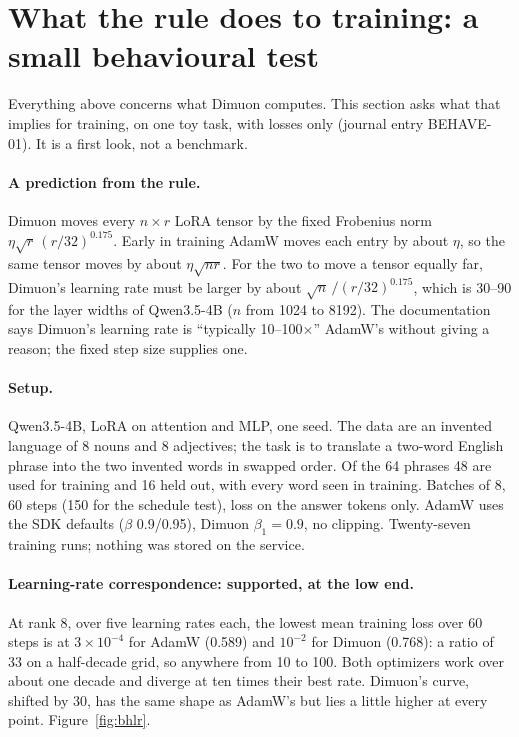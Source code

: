 \documentclass[11pt]{article}
\begin{document}
\section{What the rule does to training: a small behavioural test}\label{sec:behave}
Everything above concerns what Dimuon computes. This section asks what that implies for training,
on one toy task, with losses only (journal entry BEHAVE-01). It is a first look, not a benchmark.

\paragraph{A prediction from the rule.} Dimuon moves every $n\times r$ LoRA tensor by the fixed
Frobenius norm $\eta\sqrt r\,(r/32)^{0.175}$. Early in training AdamW moves each entry by about
$\eta$, so the same tensor moves by about $\eta\sqrt{nr}$. For the two to move a tensor equally
far, Dimuon's learning rate must be larger by about $\sqrt n\,/(r/32)^{0.175}$, which is 30--90 for
the layer widths of Qwen3.5-4B ($n$ from 1024 to 8192). The documentation says Dimuon's learning
rate is ``typically 10--100$\times$'' AdamW's without giving a reason; the fixed step size supplies
one.

\paragraph{Setup.} Qwen3.5-4B, LoRA on attention and MLP, one seed. The data are an invented
language of 8 nouns and 8 adjectives; the task is to translate a two-word English phrase into the
two invented words in swapped order. Of the 64 phrases 48 are used for training and 16 held out,
with every word seen in training. Batches of 8, 60 steps (150 for the schedule test), loss on the
answer tokens only. AdamW uses the SDK defaults ($\beta$ 0.9/0.95), Dimuon $\beta_1=0.9$, no
clipping. Twenty-seven training runs; nothing was stored on the service.

\paragraph{Learning-rate correspondence: supported, at the low end.} At rank 8, over five learning
rates each, the lowest mean training loss over 60 steps is at $3\times10^{-4}$ for AdamW (0.589)
and $10^{-2}$ for Dimuon (0.768): a ratio of 33 on a half-decade grid, so anywhere from 10 to 100.
Both optimizers work over about one decade and diverge at ten times their best rate. Dimuon's
curve, shifted by 30, has the same shape as AdamW's but lies a little higher at every point.
Figure~\ref{fig:bhlr}.
\end{document}
